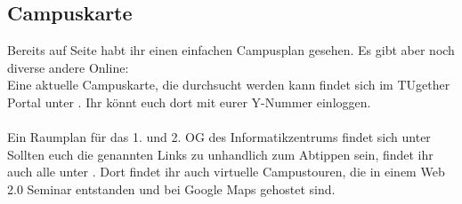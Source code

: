 \subsection{Campuskarte}
\label{campuskarte}
Bereits auf Seite \pageref{plan} habt ihr einen einfachen Campusplan
gesehen. Es gibt aber noch diverse andere Online:\\
Eine aktuelle Campuskarte, die durchsucht werden kann findet sich im
TUgether Portal unter . Ihr
könnt euch dort mit eurer Y-Nummer einloggen.\\\\

Ein Raumplan für das 1. und 2. OG des Informatikzentrums findet sich
unter\\ 
Sollten euch die genannten Links zu unhandlich zum Abtippen sein, findet ihr
auch alle unter
.
Dort findet ihr auch virtuelle Campustouren, die  in einem Web 2.0 Seminar entstanden und
bei Google Maps gehostet sind.

